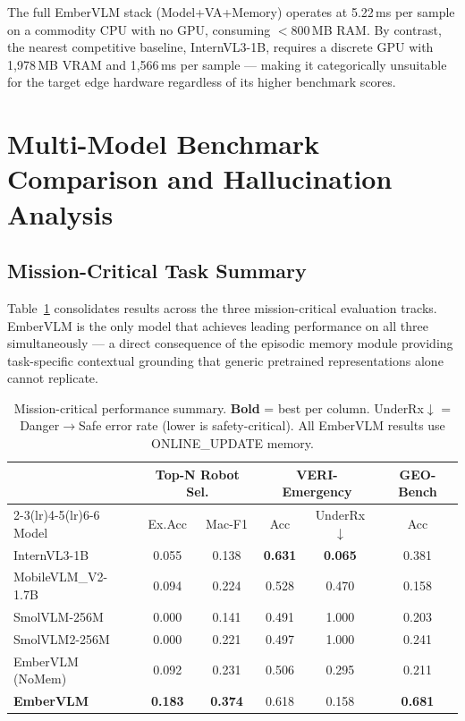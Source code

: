 \documentclass[runningheads]{llncs}
\begin{document}
The full EmberVLM stack (Model+VA+Memory) operates at 5.22\,ms per sample on a commodity CPU with no GPU, consuming $<$800\,MB RAM. By contrast, the nearest competitive baseline, InternVL3-1B, requires a discrete GPU with 1,978\,MB VRAM and 1,566\,ms per sample — making it categorically unsuitable for the target edge hardware regardless of its higher benchmark scores.

\section{Multi-Model Benchmark Comparison and Hallucination Analysis}
\label{sec:supp-baselines}

\subsection{Mission-Critical Task Summary}

Table~\ref{tab:mission-critical} consolidates results across the three mission-critical
evaluation tracks. EmberVLM is the only model that achieves leading performance on
all three simultaneously — a direct consequence of the episodic memory module
providing task-specific contextual grounding that generic pretrained representations
alone cannot replicate.

\begin{table}[ht]
\centering
\caption{Mission-critical performance summary. \textbf{Bold} = best per column.
UnderRx$\downarrow$ = Danger$\rightarrow$Safe error rate (lower is safety-critical).
All EmberVLM results use ONLINE\_UPDATE memory.}
\label{tab:mission-critical}
\setlength{\tabcolsep}{4pt}
\begin{tabular}{lccccc}
\toprule
 & \multicolumn{2}{c}{\textbf{Top-N Robot Sel.}} & \multicolumn{2}{c}{\textbf{VERI-Emergency}} & \textbf{GEO-Bench} \\
\cmidrule(lr){2-3}\cmidrule(lr){4-5}\cmidrule(lr){6-6}
Model & Ex.Acc & Mac-F1 & Acc & UnderRx$\downarrow$ & Acc \\
\midrule
InternVL3-1B       & 0.055 & 0.138 & \textbf{0.631} & \textbf{0.065} & 0.381 \\
MobileVLM\_V2-1.7B & 0.094 & 0.224 & 0.528 & 0.470 & 0.158 \\
SmolVLM-256M       & 0.000 & 0.141 & 0.491 & 1.000 & 0.203 \\
SmolVLM2-256M      & 0.000 & 0.221 & 0.497 & 1.000 & 0.241 \\
EmberVLM (NoMem)   & 0.092 & 0.231 & 0.506 & 0.295 & 0.211 \\
\textbf{EmberVLM}  & \textbf{0.183} & \textbf{0.374} & 0.618 & 0.158 & \textbf{0.681} \\
\bottomrule
\end{tabular}
\end{table}
\end{document}

